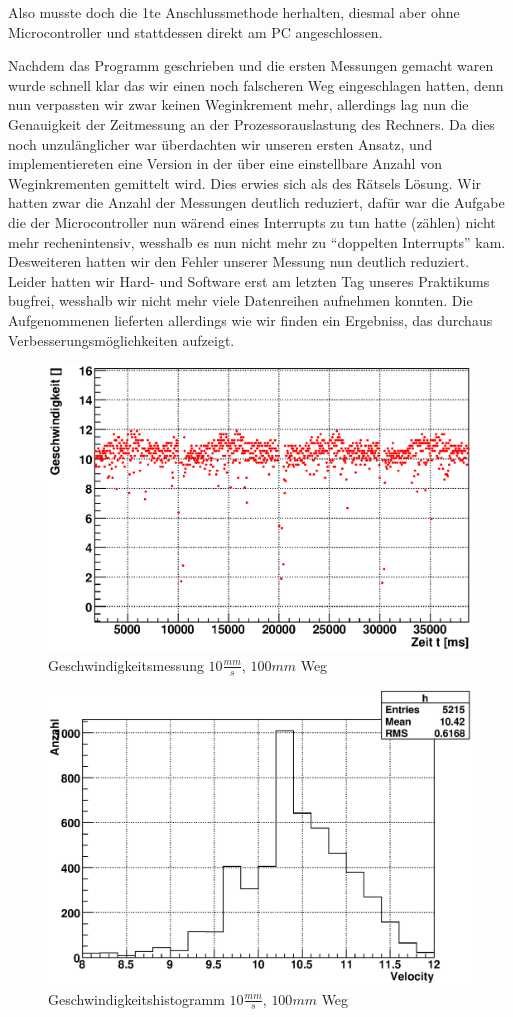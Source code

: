\documentclass[12pt]{article}
\begin{document}
Also musste doch die 1te Anschlussmethode herhalten, diesmal aber ohne Microcontroller und stattdessen direkt am PC angeschlossen.

Nachdem das Programm geschrieben und die ersten Messungen gemacht waren wurde schnell klar das wir einen noch falscheren Weg eingeschlagen hatten, denn nun verpassten wir zwar keinen Weginkrement mehr, allerdings 
lag nun die Genauigkeit der Zeitmessung an der Prozessorauslastung des Rechners. Da dies noch unzulänglicher war überdachten wir unseren ersten Ansatz, und implementiereten eine Version in der über eine einstellbare Anzahl von Weginkrementen gemittelt wird.
Dies erwies sich als des Rätsels Lösung. Wir hatten zwar die Anzahl der Messungen deutlich reduziert, dafür war die Aufgabe die der Microcontroller nun wärend eines Interrupts zu tun hatte (zählen) nicht mehr rechenintensiv, wesshalb es nun nicht mehr zu ``doppelten Interrupts'' kam.
Desweiteren hatten wir den Fehler unserer Messung nun deutlich reduziert. Leider hatten wir Hard- und Software erst am letzten Tag unseres Praktikums bugfrei, wesshalb wir nicht mehr viele Datenreihen aufnehmen konnten. Die Aufgenommenen lieferten allerdings wie wir finden ein 
Ergebniss, das durchaus Verbesserungsmöglichkeiten aufzeigt.
\begin{figure}[H]
 \includegraphics[width=0.9\linewidth]{pictures/speed.eps}
 \caption{Geschwindigkeitsmessung $10\frac{mm}{s}$, $100mm$ Weg}
\end{figure}
\begin{figure}[H]
 \includegraphics[width=0.9\linewidth]{pictures/speed-histo.eps}
 \caption{Geschwindigkeitshistogramm $10\frac{mm}{s}$, $100mm$ Weg}
\end{figure}
\end{document}
